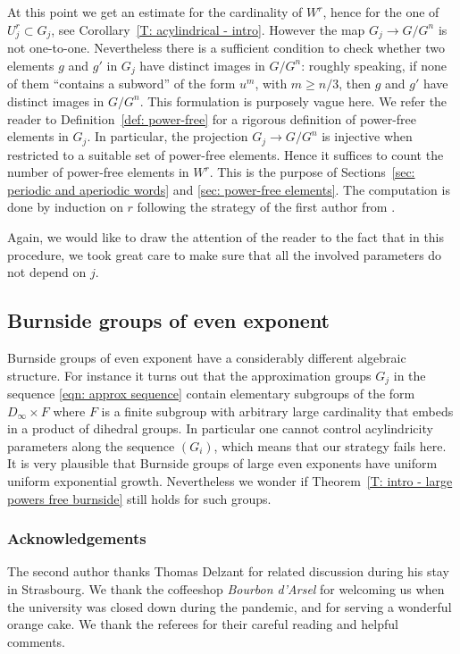 At this point we get an estimate for the cardinality of $W^r$, hence for the one of $U_j^r\subset G_j$, see Corollary~\ref{T: acylindrical - intro}.
However the map $G_j \to G/G^n$ is not one-to-one.
Nevertheless there is a sufficient condition to check whether two elements $g$ and $g'$ in $G_j$ have distinct images in $G/G^n$: roughly speaking, if none of them ``contains a subword'' of the form $u^m$, with $m \geq n/3$, then $g$ and $g'$ have distinct images in $G/G^n$.
This formulation is purposely vague here.
We refer the reader to Definition~\ref{def: power-free} for a rigorous definition of power-free elements in $G_j$.
In particular, the projection $G_j \to G/G^n$ is injective when restricted to a suitable set of power-free elements.
Hence it suffices to count the number of power-free elements in $W^r$.
This is the purpose of Sections~\ref{sec: periodic and aperiodic words} and \ref{sec: power-free elements}.
The computation is done by induction on $r$ following the strategy of the first author from \cite{coulon_growth_2013}.

Again, we would like to draw the attention of the reader to the fact that in this procedure, we took great care to make sure that all the involved parameters do not depend on $j$.

\subsection{Burnside groups of even exponent}
\label{sec: discussion-even-exp}
Burnside groups of even exponent have a considerably different algebraic structure.
For instance it turns out that the approximation groups $G_j$ in the sequence \eqref{eqn: approx sequence} contain elementary subgroups of the form $D_\infty \times F$ where $F$ is a finite subgroup with arbitrary large cardinality that embeds in a product of dihedral groups.
In particular one cannot control acylindricity parameters along the sequence $(G_i)$, which means that our strategy fails here.
It is very plausible that Burnside groups of large even exponents have uniform uniform exponential growth.
Nevertheless we wonder if Theorem~\ref{T: intro - large powers free burnside} still holds for such groups.

\subsubsection*{Acknowledgements}
The second author thanks Thomas Delzant for related discussion during his stay in Strasbourg. We thank the coffeeshop \emph{Bourbon d'Arsel} for welcoming us when the university was closed down during the pandemic, and for serving a wonderful orange cake. We thank the referees for their careful reading and helpful comments.


